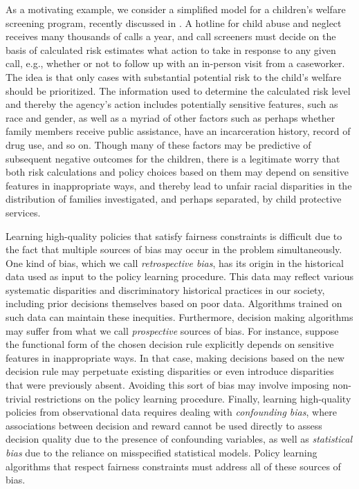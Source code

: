 \documentclass{article}
\begin{document}
As a motivating example, we consider a simplified model for a children's welfare screening program, recently discussed in \cite{chouldechova2018case, Hurley18child}. A hotline for child abuse and neglect receives many thousands of calls a year, and call screeners must decide on the basis of calculated risk estimates what action to take in response to any given call, e.g., whether or not to follow up with an in-person visit from a caseworker. The idea is that only cases with substantial potential risk to the child's welfare should be prioritized. The information used to determine the calculated risk level and thereby the agency's action includes potentially sensitive features, such as race and gender, as well as a myriad of other factors such as perhaps whether family members receive public assistance, have an incarceration history, record of drug use, and so on. Though many of these factors may be predictive of subsequent negative outcomes for the children, there is a legitimate worry that both risk calculations and policy choices based on them may depend on sensitive features in inappropriate ways, and thereby lead
to unfair racial disparities in the distribution of families investigated, and perhaps separated, by child protective services.

Learning high-quality policies that satisfy fairness constraints is difficult due to the fact that multiple sources of bias may occur in the problem simultaneously. One kind of bias, which we call \emph{retrospective bias}, has its origin in the historical data used as input to the policy learning procedure.  This data may reflect various systematic disparities and discriminatory historical practices in our society, including prior decisions themselves based on poor data.  Algorithms trained on such data can %
maintain these inequities.  Furthermore, decision making algorithms may suffer from what we call \emph{prospective} sources of bias. For instance, suppose the functional form of the chosen decision rule explicitly depends on sensitive features in inappropriate ways.  In that case, making decisions based on the new decision rule may perpetuate existing disparities or even introduce disparities that were previously absent.  Avoiding this sort of bias may involve imposing non-trivial restrictions on the policy learning procedure. Finally, learning high-quality policies from observational data requires dealing with \emph{confounding bias}, where associations between decision and reward cannot be used directly to assess decision quality due to the presence of confounding variables, as well as \emph{statistical bias} due to the reliance on misspecified statistical models.  Policy learning algorithms that respect fairness constraints must address all of these sources of bias.
\end{document}
